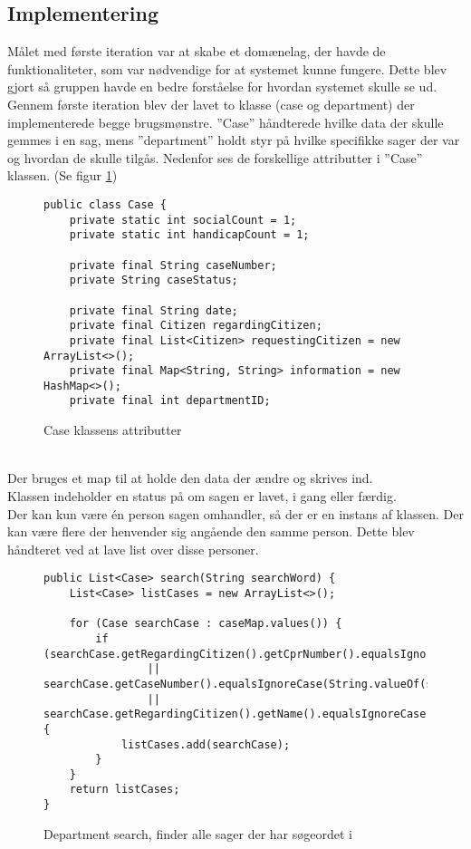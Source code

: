 \subsection{Implementering}
Målet med første iteration var at skabe et domænelag, der havde de funktionaliteter, som var nødvendige for at systemet kunne fungere. Dette blev gjort så gruppen havde en bedre forståelse for hvordan systemet skulle se ud. 
Gennem første iteration blev der lavet to klasse (case og department) der implementerede begge brugsmønstre. ”Case” håndterede hvilke data der skulle gemmes i en sag, mens ”department” holdt styr på hvilke specifikke sager der var og hvordan de skulle tilgås.  Nedenfor ses de forskellige attributter i ”Case” klassen. (Se figur \ref{kode:caseatt})
\begin{figure}[h]
\begin{lstlisting}
public class Case {
    private static int socialCount = 1;
    private static int handicapCount = 1;

    private final String caseNumber;
    private String caseStatus;

    private final String date;
    private final Citizen regardingCitizen;
    private final List<Citizen> requestingCitizen = new ArrayList<>();
    private final Map<String, String> information = new HashMap<>();
    private final int departmentID;
\end{lstlisting}
\caption{Case klassens attributter}
\label{kode:caseatt}
\end{figure}\\
Der bruges et map til at holde den data der ændre og skrives ind.\\ 
Klassen indeholder en status på om sagen er lavet, i gang eller færdig.\\ 
Der kan kun være én person sagen omhandler, så der er en instans af klassen. Der kan være flere der henvender sig angående den samme person. Dette blev håndteret ved at lave list over disse personer. 
\begin{figure}
\begin{lstlisting}
public List<Case> search(String searchWord) {
	List<Case> listCases = new ArrayList<>();
	
	for (Case searchCase : caseMap.values()) {
		if (searchCase.getRegardingCitizen().getCprNumber().equalsIgnoreCase(searchWord)
				|| searchCase.getCaseNumber().equalsIgnoreCase(String.valueOf(searchWord))
				|| searchCase.getRegardingCitizen().getName().equalsIgnoreCase(searchWord)) {
            listCases.add(searchCase);
		}
	}
	return listCases;
}
\end{lstlisting}
\caption{Department search, finder alle sager der har søgeordet i}
\label{kode:search}
\end{figure}
